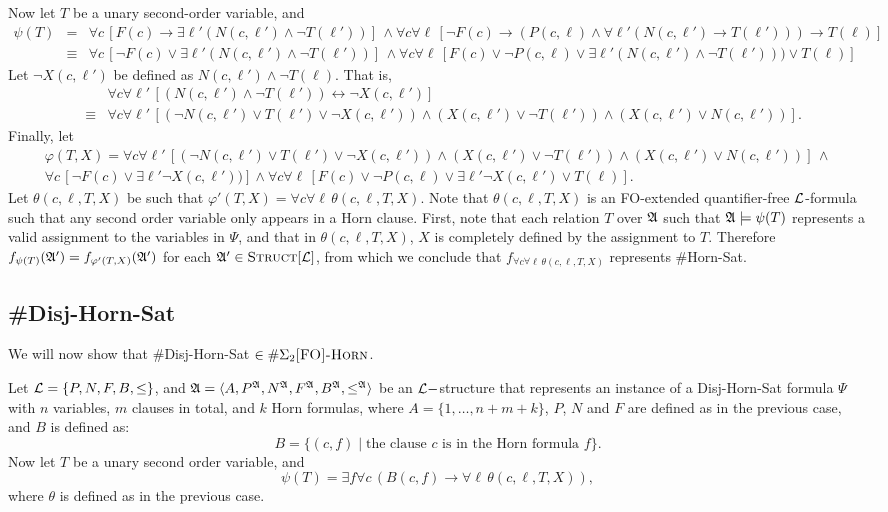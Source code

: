 Now let $T$ be a unary second-order variable, and
\begin{align*}
	\psi(T) &=& \forall c\,[ F(c) \to \exists \ell'(N(c,\ell') \wedge \neg T(\ell'))]
	\,\wedge
	 \forall c \forall \ell\, [\neg F(c)\to(P(c,\ell)\wedge\forall\ell'(N(c,\ell')\to T(\ell')))\to T(\ell)] \\
	 &\equiv& \forall c\,[ \neg F(c) \vee \exists \ell'(N(c,\ell') \wedge \neg T(\ell'))]
	 \,\wedge
	 \forall c \forall \ell\, [ F(c) \vee \neg P(c,\ell) \vee \exists\ell'(N(c,\ell') \wedge \neg T(\ell'))) \vee T(\ell)]
\end{align*}
Let $\neg X(c,\ell')$ be defined as $N(c,\ell')\wedge \neg T(\ell)$. That is,
\begin{eqnarray*}
	&& \forall c \forall \ell'\, [(N(c,\ell') \wedge \neg T(\ell')) \leftrightarrow \neg X(c,\ell')]\\
	&\equiv& \forall c \forall \ell'\,[(\neg N(c,\ell')\vee T(\ell')\vee \neg X(c,\ell'))\wedge (X(c,\ell')\vee \neg T(\ell'))\wedge (X(c,\ell')\vee N(c,\ell'))].
\end{eqnarray*}
Finally, let
\begin{multline*}
	\varphi(T,X) = \forall c \forall \ell'\,[(\neg N(c,\ell')\vee T(\ell')\vee \neg X(c,\ell'))\wedge (X(c,\ell')\vee \neg T(\ell'))\wedge (X(c,\ell')\vee N(c,\ell'))]\,\wedge \\
	\forall c\,[ \neg F(c) \vee \exists \ell'\neg X(c,\ell'))]
	\wedge
	\forall c \forall \ell\, [ F(c) \vee \neg P(c,\ell) \vee \exists\ell'\neg X(c,\ell') \vee T(\ell)].
\end{multline*}
Let $\theta(c,\ell,T,X)$ be such that $\varphi'(T,X) = \forall c \forall \ell\,\theta(c,\ell,T,X)$. Note that $\theta(c,\ell,T,X)$ is an {\sc FO}-extended quantifier-free ${\cal L}$-formula such that any second order variable only appears in a Horn clause. First, note that each relation $T$ over ${\frak A}$ such that ${\frak A}\models \psi(T)$ represents a valid assignment to the variables in $\Psi$, and that in $\theta(c,\ell,T,X)$, $X$ is completely defined by the assignment to $T$. Therefore $f_{\psi(T)}({\frak A}') = f_{\varphi'(T,X)}({\frak A}')$ for each ${\frak A}'\in\textsc{Struct}[{\cal L}]$, from which we conclude that $f_{\forall c \forall \ell\,\theta(c,\ell,T,X)}$ represents {\sc \#Horn-Sat}. 

\subsection{{\sc \#Disj-Horn-Sat}}
We will now show that {\sc \#Disj-Horn-Sat} $\in\#\Sigma_2\textsc{[FO]-Horn}$.

Let ${\cal L} = \{P,N,F,B,\leq\}$, and ${\frak A} = \langle A, P^{\frak A}, N^{\frak A}, F^{\frak A}, B^{\frak A}, \leq^{\frak A} \rangle$ be an ${\cal L}-$structure that represents an instance of a {\sc Disj-Horn-Sat} formula $\Psi$ with $n$ variables, $m$ clauses in total, and $k$ Horn formulas, where $A = \{1,\ldots,n+m+k\}$, $P$, $N$ and $F$ are defined as in the previous case, and $B$ is defined as:
\[
	B = \{ (c,f) \mid 
		\mbox{the clause $c$ is in the Horn formula $f$}
	\}.
\]
Now let $T$ be a unary second order variable, and
\[
	\psi(T) = \exists f\forall c\,(B(c,f)\to \forall\ell\,\theta(c,\ell,T,X)),
\]
where $\theta$ is defined as in the previous case.